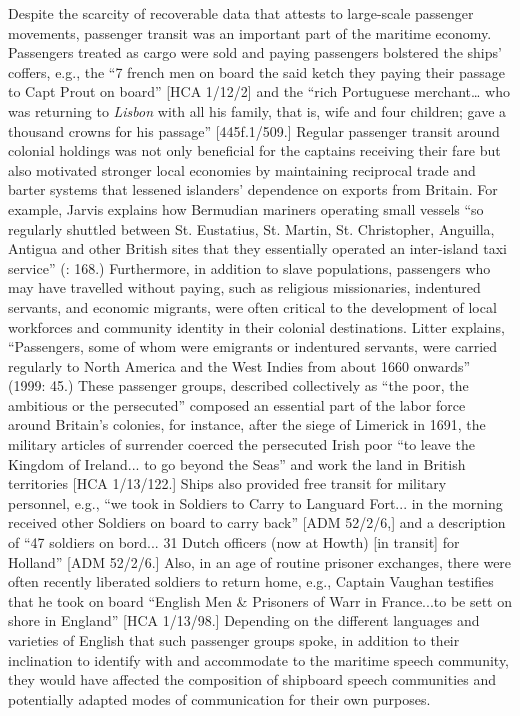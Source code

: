 Despite the scarcity of recoverable data that attests to large-scale passenger movements, passenger transit was an important part of the maritime economy. Passengers treated as cargo were sold and paying passengers bolstered the ships’ coffers, e.g., the “7 french men on board the said ketch they paying their passage to Capt Prout on board” [HCA 1/12/2] and the “rich Portuguese merchant… who was returning to \textit{Lisbon} with all his family, that is, wife and four children; gave a thousand crowns for his passage” [445f.1/509.] Regular passenger transit around colonial holdings was not only beneficial for the captains receiving their fare but also motivated stronger local economies by maintaining reciprocal trade and barter systems that lessened islanders’ dependence on exports from Britain. For example, Jarvis explains how Bermudian mariners operating small vessels “so regularly shuttled between St. Eustatius, St. Martin, St. Christopher, Anguilla, Antigua and other British sites that they essentially operated an inter-island taxi service” (\citealt{Jarvis2010}: 168.) Furthermore, in addition to slave populations, passengers who may have travelled without paying, such as religious missionaries, indentured servants, and economic migrants, were often critical to the development of local workforces and community identity in their colonial destinations. Litter explains, “Passengers, some of whom were emigrants or indentured servants, were carried regularly to North America and the West Indies from about 1660 onwards” (1999: 45.) These passenger groups, described collectively as “the poor, the ambitious or the persecuted” \citep[45]{Litter1999} composed an essential part of the labor force around Britain's colonies, for instance, after the siege of Limerick in 1691, the military articles of surrender coerced the persecuted Irish poor “to leave the Kingdom of Ireland... to go beyond the Seas” and work the land in British territories [HCA 1/13/122.] Ships also provided free transit for military personnel, e.g., “we took in Soldiers to Carry to Languard Fort... in the morning received other Soldiers on board to carry back” [ADM 52/2/6,] and a description of “47 soldiers on bord... 31 Dutch officers (now at Howth) [in transit] for Holland” [ADM 52/2/6.] Also, in an age of routine prisoner exchanges, there were often recently liberated soldiers to return home, e.g., Captain Vaughan testifies that he took on board “English Men \& Prisoners of Warr in France...to be sett on shore in England” [HCA 1/13/98.] Depending on the different languages and varieties of English that such passenger groups spoke, in addition to their inclination to identify with and accommodate to the maritime speech community, they would have affected the composition of shipboard speech communities and potentially adapted modes of communication for their own purposes. 

